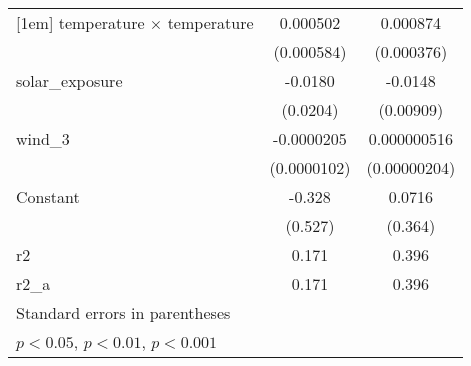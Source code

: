 {\begin{tabular}{l*{2}{c}}
[1em]
temperature $\times$ temperature&    0.000502         &    0.000874         \\
                    &  (0.000584)         &  (0.000376)         \\
[1em]
solar\_exposure      &     -0.0180         &     -0.0148         \\
                    &    (0.0204)         &   (0.00909)         \\
[1em]
wind\_3              &  -0.0000205         & 0.000000516         \\
                    & (0.0000102)         &(0.00000204)         \\
[1em]
Constant            &      -0.328         &      0.0716         \\
                    &     (0.527)         &     (0.364)         \\
\hline
r2                  &       0.171         &       0.396         \\
r2\_a                &       0.171         &       0.396         \\
\hline\hline
\multicolumn{3}{l}{\footnotesize Standard errors in parentheses}\\
\multicolumn{3}{l}{\footnotesize \sym{*} \(p<0.05\), \sym{**} \(p<0.01\), \sym{***} \(p<0.001\)}\\
\end{tabular}
}

